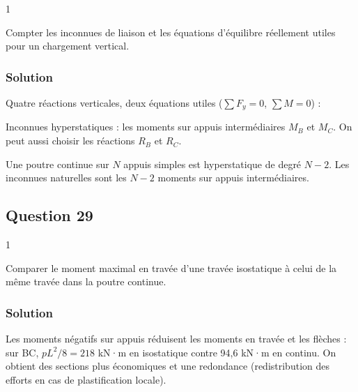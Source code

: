 \documentclass[11pt,a4paper]{article}
\newcommand{\equationajustee}[1]{%
  \sbox{\boiteequation}{$\displaystyle #1$}%
  \ifdim\wd\boiteequation>\linewidth
    \[\resizebox{\linewidth}{!}{\usebox{\boiteequation}}\]%
  \else
    \[#1\]%
  \fi}
\begin{document}
\begin{indication}{1}

Compter les inconnues de liaison et les équations d'équilibre réellement utiles pour un chargement vertical.

\end{indication}

\hypertarget{solution-27}{%
\subsubsection{Solution}\label{solution-27}}

Quatre réactions verticales, deux équations utiles (\(\sum F_y=0\), \(\sum M=0\)) :

\equationajustee{\boxed{h=2}}

Inconnues hyperstatiques : les moments sur appuis intermédiaires \(M_B\) et \(M_C\). On peut aussi choisir les réactions \(R_B\) et \(R_C\).

\begin{methode}

Une poutre continue sur \(N\) appuis simples est hyperstatique de degré \(N-2\). Les inconnues naturelles sont les \(N-2\) moments sur appuis intermédiaires.

\end{methode}

\hypertarget{question-29}{%
\subsection{Question 29}\label{question-29}}

\begin{indication}{1}

Comparer le moment maximal en travée d'une travée isostatique à celui de la même travée dans la poutre continue.

\end{indication}

\hypertarget{solution-28}{%
\subsubsection{Solution}\label{solution-28}}

Les moments négatifs sur appuis réduisent les moments en travée et les flèches : sur BC, \(pL^2/8=218\) kN·m en isostatique contre 94,6 kN·m en continu. On obtient des sections plus économiques et une redondance (redistribution des efforts en cas de plastification locale).
\end{document}
